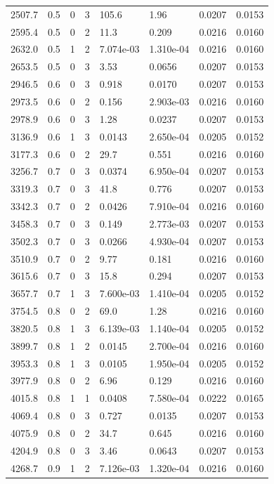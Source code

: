 \documentclass[preview]{standalone}
\begin{document}
{{{\begin{tabular}{L{1.2cm}C{1.2cm} C{0.3cm}C{0.5cm} C{1.4cm}C{1.4cm} C{1.4cm}C{1.4cm}}
  2507.7  &   0.5  & 0     &  3 &  105.6  & 1.96  & 0.0207 &  0.0153   \\ 
  2595.4  &   0.5  & 0     &  2 &  11.3  & 0.209  & 0.0216 &  0.0160   \\ 
  2632.0  &   0.5  & 1     &  2 &  7.074e-03  & 1.310e-04  & 0.0216 &  0.0160   \\ 
  2653.5  &   0.5  & 0     &  3 &  3.53  & 0.0656  & 0.0207 &  0.0153   \\ 
  2946.5  &   0.6  & 0     &  3 &  0.918  & 0.0170  & 0.0207 &  0.0153   \\ 
  2973.5  &   0.6  & 0     &  2 &  0.156  & 2.903e-03  & 0.0216 &  0.0160   \\ 
  2978.9  &   0.6  & 0     &  3 &  1.28  & 0.0237  & 0.0207 &  0.0153   \\ 
  3136.9  &   0.6  & 1     &  3 &  0.0143  & 2.650e-04  & 0.0205 &  0.0152   \\ 
  3177.3  &   0.6  & 0     &  2 &  29.7  & 0.551  & 0.0216 &  0.0160   \\ 
  3256.7  &   0.7  & 0     &  3 &  0.0374  & 6.950e-04  & 0.0207 &  0.0153   \\ 
  3319.3  &   0.7  & 0     &  3 &  41.8  & 0.776  & 0.0207 &  0.0153   \\ 
  3342.3  &   0.7  & 0     &  2 &  0.0426  & 7.910e-04  & 0.0216 &  0.0160   \\ 
  3458.3  &   0.7  & 0     &  3 &  0.149  & 2.773e-03  & 0.0207 &  0.0153   \\ 
  3502.3  &   0.7  & 0     &  3 &  0.0266  & 4.930e-04  & 0.0207 &  0.0153   \\ 
  3510.9  &   0.7  & 0     &  2 &  9.77  & 0.181  & 0.0216 &  0.0160   \\ 
  3615.6  &   0.7  & 0     &  3 &  15.8  & 0.294  & 0.0207 &  0.0153   \\ 
  3657.7  &   0.7  & 1     &  3 &  7.600e-03  & 1.410e-04  & 0.0205 &  0.0152   \\ 
  3754.5  &   0.8  & 0     &  2 &  69.0  & 1.28  & 0.0216 &  0.0160   \\ 
  3820.5  &   0.8  & 1     &  3 &  6.139e-03  & 1.140e-04  & 0.0205 &  0.0152   \\ 
  3899.7  &   0.8  & 1     &  2 &  0.0145  & 2.700e-04  & 0.0216 &  0.0160   \\ 
  3953.3  &   0.8  & 1     &  3 &  0.0105  & 1.950e-04  & 0.0205 &  0.0152   \\ 
  3977.9  &   0.8  & 0     &  2 &  6.96  & 0.129  & 0.0216 &  0.0160   \\ 
  4015.8  &   0.8  & 1     &  1 &  0.0408  & 7.580e-04  & 0.0222 &  0.0165   \\ 
  4069.4  &   0.8  & 0     &  3 &  0.727  & 0.0135  & 0.0207 &  0.0153   \\ 
  4075.9  &   0.8  & 0     &  2 &  34.7  & 0.645  & 0.0216 &  0.0160   \\ 
  4204.9  &   0.8  & 0     &  3 &  3.46  & 0.0643  & 0.0207 &  0.0153   \\ 
  4268.7  &   0.9  & 1     &  2 &  7.126e-03  & 1.320e-04  & 0.0216 &  0.0160   \\ 
\hline 
\end{tabular} 

}}}
\end{document}
